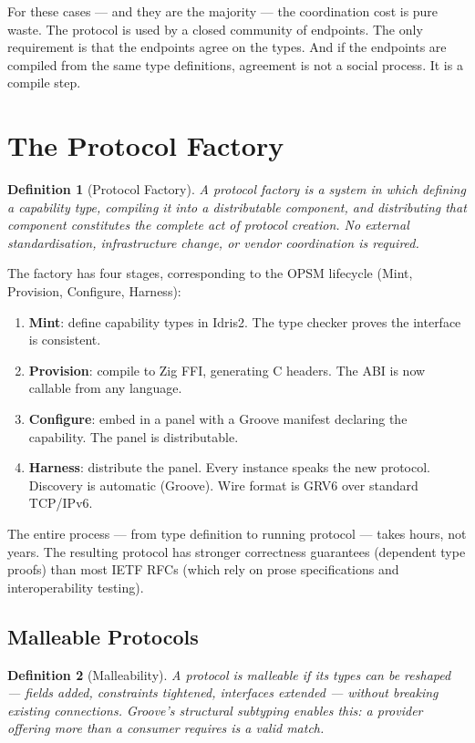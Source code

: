 \documentclass[11pt,a4paper]{article}
\newtheorem{definition}{Definition}
\begin{document}
For these cases --- and they are the majority --- the coordination cost
is pure waste. The protocol is used by a closed community of endpoints.
The only requirement is that the endpoints agree on the types. And if the
endpoints are compiled from the same type definitions, agreement is not a
social process. It is a compile step.

\section{The Protocol Factory}

\begin{definition}[Protocol Factory]
A \emph{protocol factory} is a system in which defining a capability
type, compiling it into a distributable component, and distributing
that component constitutes the complete act of protocol creation.
No external standardisation, infrastructure change, or vendor
coordination is required.
\end{definition}

The factory has four stages, corresponding to the OPSM lifecycle
(Mint, Provision, Configure, Harness):

\begin{enumerate}
\item \textbf{Mint}: define capability types in Idris2. The type checker
  proves the interface is consistent.
\item \textbf{Provision}: compile to Zig FFI, generating C headers. The
  ABI is now callable from any language.
\item \textbf{Configure}: embed in a panel with a Groove manifest
  declaring the capability. The panel is distributable.
\item \textbf{Harness}: distribute the panel. Every instance speaks the
  new protocol. Discovery is automatic (Groove). Wire format is GRV6
  over standard TCP/IPv6.
\end{enumerate}

The entire process --- from type definition to running protocol --- takes
hours, not years. The resulting protocol has stronger correctness
guarantees (dependent type proofs) than most IETF RFCs (which rely on
prose specifications and interoperability testing).

\subsection{Malleable Protocols}

\begin{definition}[Malleability]
A protocol is \emph{malleable} if its types can be reshaped --- fields
added, constraints tightened, interfaces extended --- without breaking
existing connections. Groove's structural subtyping enables this: a
provider offering more than a consumer requires is a valid match.
\end{definition}
\end{document}
